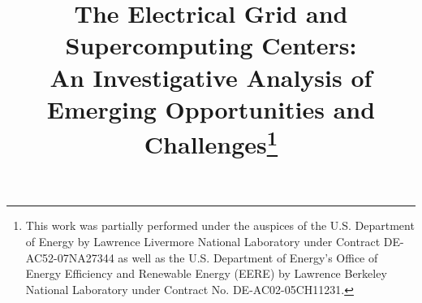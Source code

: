 \documentclass{../style/sig-alternate}
\begin{document}
%

\title{
The Electrical Grid and Supercomputing Centers:\\
An Investigative Analysis of Emerging Opportunities and Challenges\thanks{This work was partially performed under the auspices of the U.S. Department of Energy by Lawrence Livermore National Laboratory under Contract DE-AC52-07NA27344 as well as the U.S. Department of Energy's Office of Energy Efficiency and Renewable Energy (EERE) by Lawrence Berkeley National Laboratory under Contract No. DE-AC02-05CH11231.}
}

%


\maketitle              %

\end{document}
